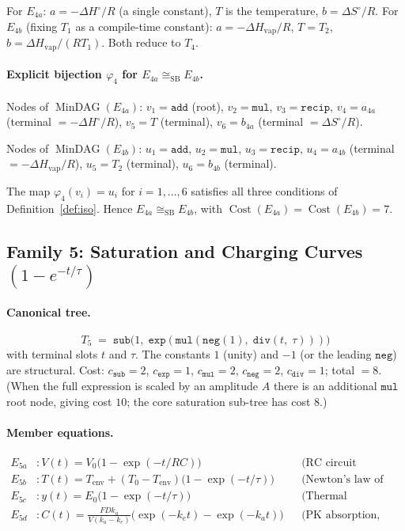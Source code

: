 \documentclass[12pt,a4paper]{article}
\theoremstyle{definition}
\newcommand{\Cost}{\operatorname{Cost}}
\newcommand{\MinDAG}{\operatorname{MinDAG}}
\newcommand{\mexp}{\mathtt{exp}}
\newcommand{\mmul}{\mathtt{mul}}
\newcommand{\mdiv}{\mathtt{div}}
\newcommand{\madd}{\mathtt{add}}
\newcommand{\msub}{\mathtt{sub}}
\newcommand{\mrecip}{\mathtt{recip}}
\newcommand{\mneg}{\mathtt{neg}}
\newcommand{\siso}{\cong_{\mathrm{SB}}}
\begin{document}
For $E_{4a}$: $a = -\Delta H^\circ/R$ (a single constant),
$T$ is the temperature, $b = \Delta S^\circ/R$.
For $E_{4b}$ (fixing $T_1$ as a compile-time constant):
$a = -\Delta H_{\mathrm{vap}}/R$, $T = T_2$,
$b = \Delta H_{\mathrm{vap}}/(RT_1)$.
Both reduce to $T_4$.

\paragraph{Explicit bijection $\varphi_{4}$ for $E_{4a} \siso E_{4b}$.}

Nodes of $\MinDAG(E_{4a})$:
$v_1 = \madd$ (root), $v_2 = \mmul$, $v_3 = \mrecip$,
$v_4 = a_{4a}$ (terminal $= -\Delta H^\circ/R$),
$v_5 = T$ (terminal), $v_6 = b_{4a}$ (terminal $= \Delta S^\circ/R$).

Nodes of $\MinDAG(E_{4b})$:
$u_1 = \madd$, $u_2 = \mmul$, $u_3 = \mrecip$,
$u_4 = a_{4b}$ (terminal $= -\Delta H_{\mathrm{vap}}/R$),
$u_5 = T_2$ (terminal), $u_6 = b_{4b}$ (terminal).

The map $\varphi_4(v_i) = u_i$ for $i=1,\ldots,6$ satisfies all three
conditions of Definition~\ref{def:iso}.  Hence $E_{4a} \siso E_{4b}$, with
$\Cost(E_{4a}) = \Cost(E_{4b}) = 7$.

\subsection{Family 5: Saturation and Charging Curves \texorpdfstring{$(1 - e^{-t/\tau})$}{(1-exp(-t/tau))}}
\label{sec:fam5}

\paragraph{Canonical tree.}
\[
  T_5 \;=\; \msub\!\bigl(1,\; \mexp(\mmul(\mneg(1),\; \mdiv(t,\;\tau)))\bigr)
\]
with terminal slots $t$ and $\tau$.  The constants $1$ (unity) and $-1$ (or
the leading $\mneg$) are structural.  Cost: $c_{\msub}=2$, $c_{\mexp}=1$,
$c_{\mmul}=2$, $c_{\mneg}=2$, $c_{\mdiv}=1$; total $= 8$.  (When the full
expression is scaled by an amplitude $A$ there is an additional $\mmul$ root
node, giving cost $10$; the core saturation sub-tree has cost $8$.)

\paragraph{Member equations.}
\begin{align*}
  E_{5a} &: V(t) = V_0\!\bigl(1 - \exp(-t/RC)\bigr)
            && \text{(RC circuit charging)} \\
  E_{5b} &: T(t) = T_{\mathrm{env}}
              + (T_0 - T_{\mathrm{env}})\!\bigl(1 - \exp(-t/\tau)\bigr)
            && \text{(Newton's law of cooling)} \\
  E_{5c} &: y(t) = E_0\!\bigl(1 - \exp(-t/\tau)\bigr)
            && \text{(Thermal subsidence, geology)} \\
  E_{5d} &: C(t) = \frac{FD k_a}{V(k_a - k_e)}
              \bigl(\exp(-k_e t) - \exp(-k_a t)\bigr)
            && \text{(PK absorption, simplified)}
\end{align*}
\end{document}
